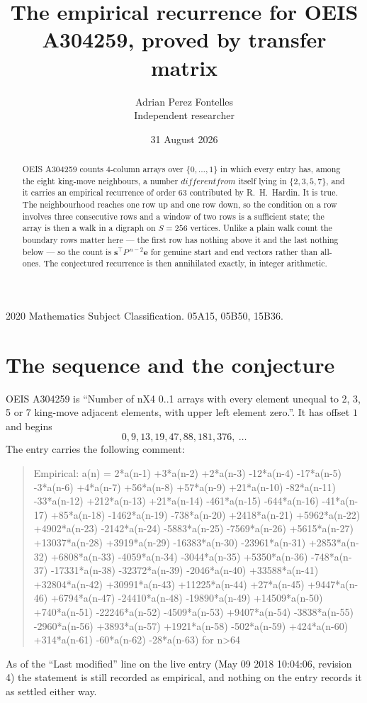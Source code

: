 \documentclass[11pt,a4paper]{article}
\title{The empirical recurrence for OEIS A304259, proved by transfer matrix}
\author{Adrian Perez Fontelles\\ \small Independent researcher}
\date{31 August 2026}
\theoremstyle{plain}
\theoremstyle{definition}
\begin{document}
\maketitle

\begin{abstract}
OEIS A304259 counts $4$-column arrays over $\{0,\dots,1\}$ in which every entry has,
among the eight king-move neighbours, a number $different from$ itself lying in $\{2,3,5,7\}$, and it carries an empirical
recurrence of order $63$ contributed by R.~H.~Hardin. It is true. The neighbourhood
reaches one row up and one row down, so the condition on a row involves three consecutive
rows and a window of two rows is a sufficient state; the array is then a walk in a digraph
on $S=256$ vertices. Unlike a plain walk count the boundary rows matter here --- the first
row has nothing above it and the last nothing below --- so the count is
$\mathbf{s}^{\!\top}P^{\,n-2}\mathbf{e}$ for genuine start and end vectors rather than
all-ones. The conjectured recurrence is then annihilated exactly, in integer arithmetic.
\end{abstract}

\noindent\small 2020 Mathematics Subject Classification. 05A15, 05B50, 15B36.\normalsize

\section{The sequence and the conjecture}

OEIS A304259 is ``Number of nX4 0..1 arrays with every element unequal to 2, 3, 5 or 7 king-move adjacent elements, with upper left element zero.''. It has offset
$1$ and begins
\[
0, 9, 13, 19, 47, 88, 181, 376,\ \dots
\]
The entry carries the following comment:
\begin{quote}\small
Empirical: a(n) = 2*a(n-1) +3*a(n-2) +2*a(n-3) -12*a(n-4) -17*a(n-5) -3*a(n-6) +4*a(n-7) +56*a(n-8) +57*a(n-9) +21*a(n-10) -82*a(n-11) -33*a(n-12) +212*a(n-13) +21*a(n-14) -461*a(n-15) -644*a(n-16) -41*a(n-17) +85*a(n-18) -1462*a(n-19) -738*a(n-20) +2418*a(n-21) +5962*a(n-22) +4902*a(n-23) -2142*a(n-24) -5883*a(n-25) -7569*a(n-26) +5615*a(n-27) +13037*a(n-28) +3919*a(n-29) -16383*a(n-30) -23961*a(n-31) +2853*a(n-32) +6808*a(n-33) -4059*a(n-34) -3044*a(n-35) +5350*a(n-36) -748*a(n-37) -17331*a(n-38) -32372*a(n-39) -2046*a(n-40) +33588*a(n-41) +32804*a(n-42) +30991*a(n-43) +11225*a(n-44) +27*a(n-45) +9447*a(n-46) +6794*a(n-47) -24410*a(n-48) -19890*a(n-49) +14509*a(n-50) +740*a(n-51) -22246*a(n-52) -4509*a(n-53) +9407*a(n-54) -3838*a(n-55) -2960*a(n-56) +3893*a(n-57) +1921*a(n-58) -502*a(n-59) +424*a(n-60) +314*a(n-61) -60*a(n-62) -28*a(n-63) for n>64
\end{quote}
As of the ``Last modified'' line on the live entry (May 09 2018 10:04:06, revision
4) the statement is still recorded as empirical, and nothing on the entry
records it as settled either way.
\end{document}
